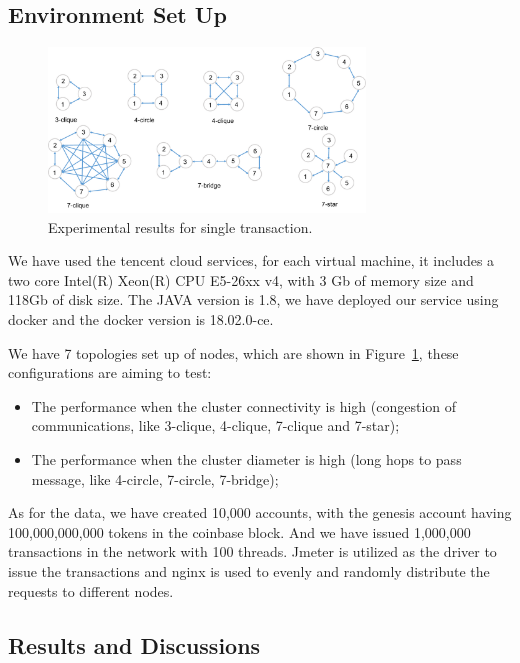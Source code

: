 \subsection {Environment Set Up}

\begin{figure}[!ht]
\begin{center}
\includegraphics[width=0.75\textwidth]{figures/cluster_set_up.pdf}
    \caption{
        Experimental results for single transaction.
     }
\label{cluster_set_up}
\end{center}
\end{figure}

We have used the tencent cloud services, for each virtual machine, it includes a two core Intel(R) Xeon(R) CPU E5-26xx v4, with 3 Gb of memory size and 118Gb of disk size. The JAVA version is 1.8, we have deployed our service using docker and the docker version is 18.02.0-ce.   

We have 7 topologies set up of nodes, which are shown in Figure~\ref{cluster_set_up}, these configurations are aiming to test: 
\begin{itemize}
    \item The performance when the cluster connectivity is high (congestion of communications, like 3-clique, 4-clique, 7-clique and 7-star);
    \item The performance when the cluster diameter is high (long hops to pass message, like 4-circle, 7-circle, 7-bridge);
\end{itemize}

As for the data, we have created 10,000 accounts, with the genesis account having 100,000,000,000 tokens in the coinbase block.
And we have issued 1,000,000 transactions in the network with 100 threads.
Jmeter is utilized as the driver to issue the transactions and nginx is used to evenly and randomly distribute the requests to different nodes.

\subsection {Results and Discussions}

